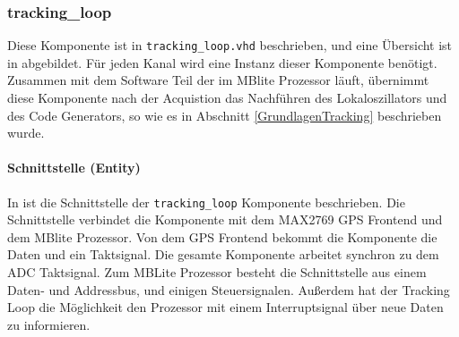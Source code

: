 \subsubsection{tracking\_loop}
Diese Komponente ist in \lstinline$tracking_loop.vhd$ beschrieben, und eine Übersicht ist in  abgebildet. Für jeden Kanal wird eine Instanz dieser Komponente benötigt. Zusammen mit dem Software Teil der im MBlite Prozessor läuft, übernimmt diese Komponente nach der Acquistion das Nachführen des Lokaloszillators und des Code Generators, so wie es in Abschnitt \ref{GrundlagenTracking} beschrieben wurde.


\paragraph{Schnittstelle (Entity)}
In  ist die Schnittstelle der \lstinline$tracking_loop$ Komponente beschrieben. Die Schnittstelle verbindet die Komponente mit dem MAX2769 GPS Frontend und dem MBlite Prozessor. Von dem GPS Frontend bekommt die Komponente die Daten und ein Taktsignal. Die gesamte Komponente arbeitet synchron zu dem ADC Taktsignal. Zum MBLite Prozessor besteht die Schnittstelle aus einem Daten- und Addressbus, und einigen Steuersignalen. Außerdem hat der Tracking Loop die Möglichkeit den Prozessor mit einem Interruptsignal über neue Daten zu informieren.

